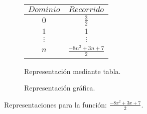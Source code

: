 \begin{figure}[h]
\centering
\begin{subfigure}[A]{0.3\textwidth}
\centering
\begin{tabular}{c|c}
$Dominio$ & $Recorrido$ \\ \hline
\hline
$0$ & $\frac{3}{2}$ \\ \hline
$1$ & $1$ \\ \hline
$\vdots$ & $\vdots$ \\ \hline
$n$& $\frac{-8 n^{2} + 3 n + 7}{2}$ \\ \hline
\end{tabular} 
\caption{Representación mediante tabla.}

\end{subfigure}%
\quad
\begin{subfigure}[B]{0.3\textwidth}
\centering



\caption{Representación gráfica.}

\end{subfigure}

\caption{Representaciones para la función: $\frac{-8 x^{2} + 3 x + 7}{2}$.}

\end{figure}

